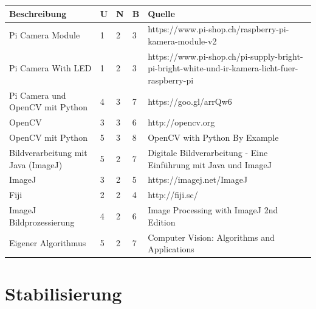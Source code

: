 \documentclass[a4paper]{report}
\begin{document}
\vspace{1em}
\noindent
\begin{tabular}{|p{}|p{}|p{}|p{}|p{}|}
	\hline
	\textbf{Beschreibung} & \textbf{U} & \textbf{N} & \textbf{B} & \textbf{Quelle} \\
	\hline
	Pi Camera Module & 1 & 2 & 3 & https://www.pi-shop.ch/raspberry-pi-kamera-module-v2\\
	\hline
	Pi Camera With LED & 1 & 2 & 3 & https://www.pi-shop.ch/pi-supply-bright-pi-bright-white-und-ir-kamera-licht-fuer-raspberry-pi\\
	\hline
	Pi Camera und OpenCV mit Python & 4 & 3 & 7 & https://goo.gl/arrQw6 \\
	\hline
	OpenCV & 3 & 3 & 6 & http://opencv.org \\
	\hline
	OpenCV mit Python & 5 & 3 & 8 & OpenCV with Python By Example \\
	\hline
	Bildverarbeitung mit Java (ImageJ) & 5 & 2 & 7 & Digitale Bildverarbeitung - Eine Einführung mit Java und ImageJ\\
	\hline
	ImageJ & 3 & 2 & 5 & https://imagej.net/ImageJ \\
	\hline
	Fiji & 2 & 2 & 4 & http://fiji.sc/ \\
	\hline
	ImageJ Bildprozessierung & 4 & 2 & 6 & Image Processing with ImageJ 2nd Edition \\
	\hline
	Eigener Algorithmus & 5 & 2 & 7 & Computer Vision: Algorithms and Applications\\
	\hline
\end{tabular}

\section{Stabilisierung}
\end{document}
